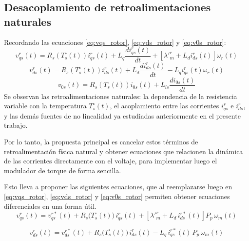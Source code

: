 \documentclass[12pt, a4paper,journal, onecolumn, compsoc]{IEEEtran}
\begin{document}
\subsection{Desacoplamiento de retroalimentaciones naturales}
Recordando las ecuaciones \eqref{eq:vqs_rotor}, \eqref{eq:vds_rotor} y \eqref{eq:v0s_rotor}:
    \begin{equation*}
        v^r_{qs}(t)=R_s(T_s^\circ(t))i^r_{qs}(t) + L_q\frac{d i^r_{qs}(t)}{dt}+[\lambda'^r_m + L_d i^r_{ds}(t)]\omega_r(t)
    \end{equation*}
    \begin{equation*}
        v_{ds}^r(t)=R_s(T_s^\circ(t))i^r_{ds}(t)+L_d\frac{d i^r_{ds}(t)}{dt} - L_qi^r_{qs}(t)\omega_r(t)
    \end{equation*}
    \begin{equation*}
        v_{0s}(t)=R_s(T_s^\circ(t))i_{0s}(t)+L_{ls}\frac{d i_{0s}(t)}{dt}
    \end{equation*}
Se observan las retroalimentaciones naturales: la dependencia de la resistencia variable con la temperatura $T_s^\circ(t)$, el acoplamiento entre las corrientes $i_{qs}^r$ e $i_{ds}^r$, y las demás fuentes de no linealidad ya estudiadas anteriormente en el presente trabajo.

Por lo tanto, la propuesta principal es cancelar estos términos de retroalimentación física natural y obtener ecuaciones que relacionen la dinámica de las corrientes directamente con el voltaje, para implementar luego el modulador de torque de forma sencilla.

Esto lleva a proponer las siguientes ecuaciones, que al reemplazarse luego en \eqref{eq:vqs_rotor}, \eqref{eq:vds_rotor} y \eqref{eq:v0s_rotor} permiten obtener ecuaciones diferenciales en una forma útil.
\begin{equation}
v_{qs}^{r}(t) = v_{qs}^{r*}(t) 
+ R_s\!\big(T_s^{\circ}(t)\big)\, i_{qs}^{r}(t) 
+ \left[\lambda'^r_m + L_d\, i_{ds}^{r*}(t)\right] P_p\, \omega_m(t)
\label{eq:vqs_r}
\end{equation}

\begin{equation}
v_{ds}^{r}(t) = v_{ds}^{r*}(t) 
+ R_s\!\big(T_s^{\circ}(t)\big)\, i_{ds}^{r}(t) 
- L_q\, i_{qs}^{r*}(t)\, P_p\, \omega_m(t)
\label{eq:vds_r}
\end{equation}
\end{document}
